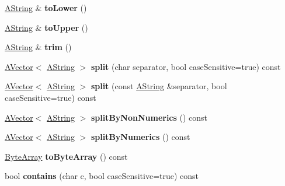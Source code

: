 \begin{DoxyCompactItemize}
\mbox{\label{class_a_string_aade3f9bf7dfe337df49f7f094068379e}} 
\mbox{\hyperlink{class_a_string}{A\+String}} \& {\bfseries to\+Lower} ()
\item 
\mbox{\label{class_a_string_af4def080314da5a03fcead8b7cf822bc}} 
\mbox{\hyperlink{class_a_string}{A\+String}} \& {\bfseries to\+Upper} ()
\item 
\mbox{\label{class_a_string_a2ba7d2ba7eb61998453f7e7ce364d441}} 
\mbox{\hyperlink{class_a_string}{A\+String}} \& {\bfseries trim} ()
\item 
\mbox{\label{class_a_string_a6379fc6d17388a71589b983ba651bf8c}} 
\mbox{\hyperlink{class_a_vector}{A\+Vector}}$<$ \mbox{\hyperlink{class_a_string}{A\+String}} $>$ {\bfseries split} (char separator, bool case\+Sensitive=true) const
\item 
\mbox{\label{class_a_string_aee23c2323dc95f9e9c19512c9c985974}} 
\mbox{\hyperlink{class_a_vector}{A\+Vector}}$<$ \mbox{\hyperlink{class_a_string}{A\+String}} $>$ {\bfseries split} (const \mbox{\hyperlink{class_a_string}{A\+String}} \&separator, bool case\+Sensitive=true) const
\item 
\mbox{\label{class_a_string_ab7375bf0b88b5923385b4cdc8fb02af8}} 
\mbox{\hyperlink{class_a_vector}{A\+Vector}}$<$ \mbox{\hyperlink{class_a_string}{A\+String}} $>$ {\bfseries split\+By\+Non\+Numerics} () const
\item 
\mbox{\label{class_a_string_a06ca78b1328505ba7c29ea2d1618ef6c}} 
\mbox{\hyperlink{class_a_vector}{A\+Vector}}$<$ \mbox{\hyperlink{class_a_string}{A\+String}} $>$ {\bfseries split\+By\+Numerics} () const
\item 
\mbox{\label{class_a_string_ae9d0a67c87c20152d5ab770ad1b955ac}} 
\mbox{\hyperlink{class_byte_array}{Byte\+Array}} {\bfseries to\+Byte\+Array} () const
\item 
\mbox{\label{class_a_string_aec4ad61af8cd225bda08719550ec8e72}} 
bool {\bfseries contains} (char c, bool case\+Sensitive=true) const
\item 
\mbox{\label{class_a_string_abe6a9966ef157e0584c279377b6c9987}} 

\end{DoxyCompactItemize}
